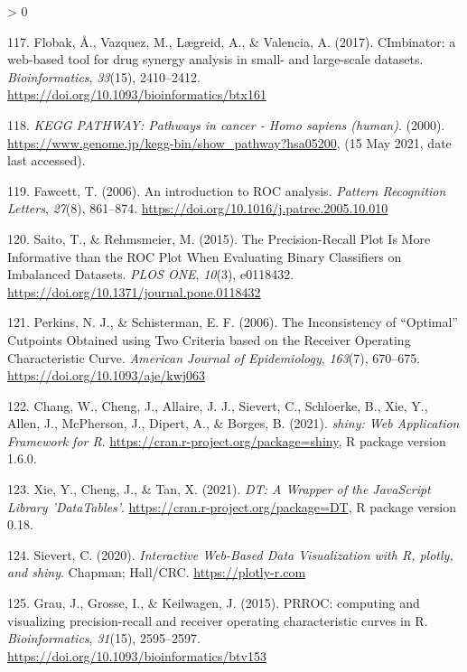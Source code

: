 \documentclass[
  12pt,
]{book}
\newlength{\cslhangindent}
\newenvironment{CSLReferences}[2] %
 {%
  \setlength{\parindent}{0pt}
  \ifodd #1 \everypar{\setlength{\hangindent}{\cslhangindent}}\ignorespaces\fi
  \ifnum #2 > 0
  \setlength{\parskip}{#2\baselineskip}
  \fi
 }%
 {}
\begin{document}
\begin{CSLReferences}{1}{0}
\leavevmode\hypertarget{ref-Flobak2017}{}%
117. Flobak, Å., Vazquez, M., Lægreid, A., \& Valencia, A. (2017). {CImbinator: a web-based tool for drug synergy analysis in small- and large-scale datasets}. \emph{Bioinformatics}, \emph{33}(15), 2410--2412. \url{https://doi.org/10.1093/bioinformatics/btx161}

\leavevmode\hypertarget{ref-kegg-cancer}{}%
118. \emph{{KEGG PATHWAY: Pathways in cancer - Homo sapiens (human)}}. (2000). \url{https://www.genome.jp/kegg-bin/show_pathway?hsa05200}, (15 May 2021, date last accessed).

\leavevmode\hypertarget{ref-Fawcett2006}{}%
119. Fawcett, T. (2006). {An introduction to ROC analysis}. \emph{Pattern Recognition Letters}, \emph{27}(8), 861--874. \url{https://doi.org/10.1016/j.patrec.2005.10.010}

\leavevmode\hypertarget{ref-Saito2015}{}%
120. Saito, T., \& Rehmsmeier, M. (2015). {The Precision-Recall Plot Is More Informative than the ROC Plot When Evaluating Binary Classifiers on Imbalanced Datasets}. \emph{PLOS ONE}, \emph{10}(3), e0118432. \url{https://doi.org/10.1371/journal.pone.0118432}

\leavevmode\hypertarget{ref-Perkins2006}{}%
121. Perkins, N. J., \& Schisterman, E. F. (2006). {The Inconsistency of {``Optimal''} Cutpoints Obtained using Two Criteria based on the Receiver Operating Characteristic Curve}. \emph{American Journal of Epidemiology}, \emph{163}(7), 670--675. \url{https://doi.org/10.1093/aje/kwj063}

\leavevmode\hypertarget{ref-Chang2021}{}%
122. Chang, W., Cheng, J., Allaire, J. J., Sievert, C., Schloerke, B., Xie, Y., Allen, J., McPherson, J., Dipert, A., \& Borges, B. (2021). \emph{{shiny: Web Application Framework for R}}. \url{https://cran.r-project.org/package=shiny}, R package version 1.6.0.

\leavevmode\hypertarget{ref-Xie2021}{}%
123. Xie, Y., Cheng, J., \& Tan, X. (2021). \emph{{DT: A Wrapper of the JavaScript Library 'DataTables'}}. \url{https://cran.r-project.org/package=DT}, R package version 0.18.

\leavevmode\hypertarget{ref-Sievert2020}{}%
124. Sievert, C. (2020). \emph{{Interactive Web-Based Data Visualization with R, plotly, and shiny}}. Chapman; Hall/CRC. \url{https://plotly-r.com}

\leavevmode\hypertarget{ref-Grau2015}{}%
125. Grau, J., Grosse, I., \& Keilwagen, J. (2015). {PRROC: computing and visualizing precision-recall and receiver operating characteristic curves in R}. \emph{Bioinformatics}, \emph{31}(15), 2595--2597. \url{https://doi.org/10.1093/bioinformatics/btv153}


\end{CSLReferences}
\end{document}
